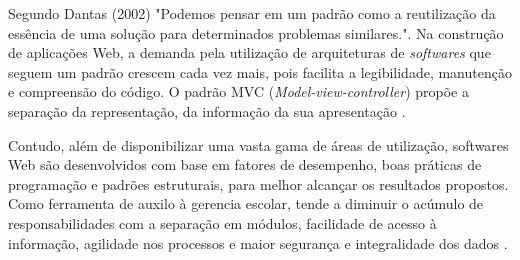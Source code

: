Segundo Dantas (2002) "Podemos pensar em um padrão como a reutilização da essência de uma solução para determinados problemas similares.". Na construção de aplicações Web, a demanda pela utilização de arquiteturas de \textit{softwares} que seguem um padrão crescem cada vez mais, pois facilita a legibilidade, manutenção e compreensão do código. O padrão MVC (\textit{Model-view-controller}) propõe a separação da representação, da informação da sua apresentação \cite{cavalcanti2006arquitetura}. 


Contudo, além de disponibilizar uma vasta gama de áreas de utilização, softwares Web são desenvolvidos com base em fatores de desempenho, boas práticas de programação e padrões estruturais, para melhor alcançar os resultados propostos. Como ferramenta de auxilo à gerencia escolar, tende a diminuir o acúmulo de responsabilidades com a separação em módulos, facilidade de acesso à informação, agilidade nos processos e maior segurança e integralidade dos dados \cite{barbosa2004contribuiccao}.


